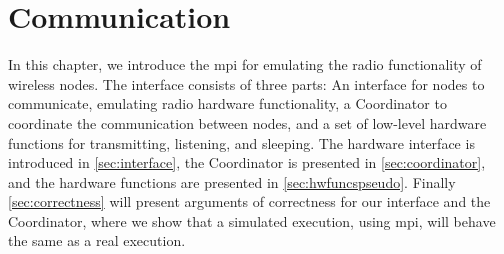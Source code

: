 \chapter{Communication}\label{ch:communication}
In this chapter, we introduce the \acrfull{mpi} for emulating the radio functionality of wireless nodes. The
interface consists of three parts: An interface for nodes to communicate, emulating radio hardware
functionality, a Coordinator to coordinate the communication between nodes, and a set of low-level hardware
functions for transmitting, listening, and sleeping. The hardware interface is introduced in
\autoref{sec:interface}, the Coordinator is presented in \autoref{sec:coordinator}, and the hardware functions
are presented in \autoref{sec:hwfuncspseudo}. Finally \autoref{sec:correctness} will present arguments of
correctness for our interface and the Coordinator, where we show that a simulated execution, using \gls{mpi},
will behave the same as a real execution.



